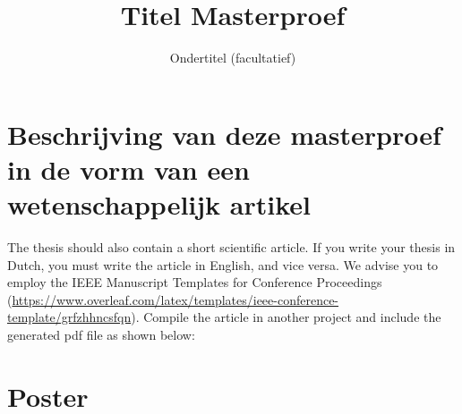 \documentclass[11pt,a4paper]{report}
\title{Titel Masterproef}
\subtitle{Ondertitel (facultatief)}
\begin{document}
\preface

\printnoidxglossary[type=\acronymtype]%
\clearpage


%
%
%

\printbibliography


\appendix


\chapter{Beschrijving van deze masterproef in de vorm van een wetenschappelijk artikel}
The thesis should also contain a short scientific article. If you write your thesis in Dutch, you must write the article in English, and vice versa. We advise you to employ the IEEE Manuscript Templates for Conference Proceedings (\url{https://www.overleaf.com/latex/templates/ieee-conference-template/grfzhhncsfqn}).
Compile the article in another project and include the generated pdf file as shown below:



\chapter{Poster}
%
\end{document}
